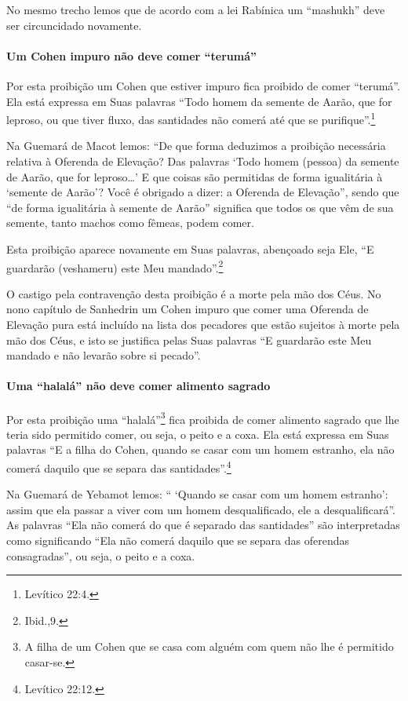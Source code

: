 No mesmo trecho lemos que de acordo com a lei Rabínica um ``mashukh''
deve ser circuncidado novamente.

\paragraph{Um Cohen impuro não deve comer ``terumá''}

Por esta proibição um Cohen que estiver impuro fica proibido de
comer ``terumá''. Ela está expressa em Suas palavras ``Todo homem da
semente de Aarão, que for leproso, ou que tiver fluxo, das santidades
não comerá até que se purifique''.\footnote{Levítico 22:4.}

Na Guemará de Macot lemos: ``De que forma deduzimos a proibição
necessária relativa à Oferenda de Elevação? Das palavras `Todo homem
(pessoa) da semente de Aarão, que for leproso\ldots{}' E que coisas são
permitidas de forma igualitária à `semente de Aarão'? Você é obrigado a
dizer: a Oferenda de Elevação'', sendo que ``de forma igualitária à
semente de Aarão'' significa que todos os que vêm de sua semente, tanto
machos como fêmeas, podem comer.

Esta proibição aparece novamente em Suas palavras, abençoado seja Ele,
``E guardarão (veshameru) este Meu mandado''.\footnote{Ibid.,9.}

O castigo pela contravenção desta proibição é a morte pela mão dos Céus.
No nono capítulo de Sanhedrin um Cohen impuro que comer uma Oferenda
de Elevação pura está incluído na lista dos pecadores que estão sujeitos
à morte pela mão dos Céus, e isto se justifica pelas Suas palavras ``E
guardarão este Meu mandado e não levarão sobre si pecado''.

\paragraph{Uma ``halalá'' não deve comer alimento sagrado}

Por esta proibição uma ``halalá''\footnote{A filha de um Cohen que se casa com alguém com quem não lhe é
  permitido casar-se.} fica proibida de
comer alimento sagrado que lhe teria sido permitido comer, ou seja, o
peito e a coxa. Ela está expressa em Suas palavras ``E a filha do
Cohen, quando se casar com um homem estranho, ela não comerá daquilo
que se separa das santidades''.\footnote{Levítico 22:12.}

Na Guemará de Yebamot lemos: `` `Quando se casar com um homem estranho':
assim que ela passar a viver com um homem desqualificado, ele a
desqualificará''. As palavras ``Ela não comerá do que é separado das
santidades'' são interpretadas como significando ``Ela não comerá
daquilo que se separa das oferendas consagradas'', ou seja, o peito e a
coxa.

